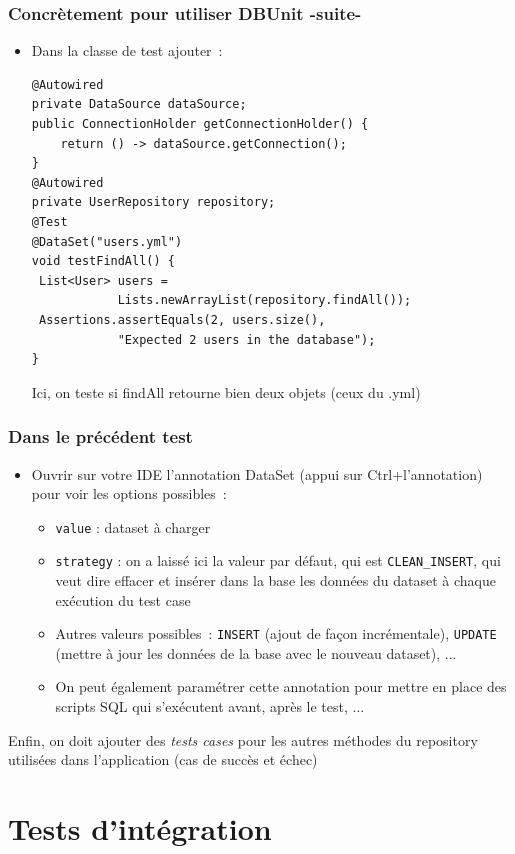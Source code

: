 \documentclass{beamer}
\begin{document}
\begin{frame}[fragile]
	\frametitle{Concrètement pour utiliser DBUnit -suite-}
	\begin{itemize}
		\item Dans la classe de test ajouter~:
\begin{lstlisting}
@Autowired
private DataSource dataSource;
public ConnectionHolder getConnectionHolder() {
	return () -> dataSource.getConnection();
}
@Autowired
private UserRepository repository;
@Test
@DataSet("users.yml")
void testFindAll() {
 List<User> users = 
            Lists.newArrayList(repository.findAll());
 Assertions.assertEquals(2, users.size(), 
            "Expected 2 users in the database");
}	
\end{lstlisting}
Ici, on teste si findAll retourne bien deux objets (ceux du .yml)
	\end{itemize}

\end{frame}

\begin{frame}[fragile]
	\frametitle{Dans le précédent test}
	\begin{itemize}
		\item Ouvrir sur votre IDE l'annotation DataSet (appui sur Ctrl+l'annotation) pour voir les options possibles~:
		\begin{itemize}
		\item \texttt{value} : dataset à charger
		\item \texttt{strategy} : on a laissé ici la valeur par défaut, qui est \texttt{CLEAN\_INSERT}, qui veut dire effacer et insérer dans la base les données du dataset à chaque exécution du test case
		\item[] Autres valeurs possibles~: \texttt{INSERT} (ajout de façon incrémentale), \texttt{UPDATE} (mettre à jour les données de la base avec le nouveau dataset), ...
		\item On peut également paramétrer cette annotation pour mettre en place des scripts SQL qui s'exécutent avant, après le test, ...

		\end{itemize}
	\end{itemize}
Enfin, on doit ajouter des \textit{tests cases} pour les autres méthodes du repository utilisées dans l'application (cas de succès et échec)
\end{frame}

\section{Tests d'intégration}
\end{document}
